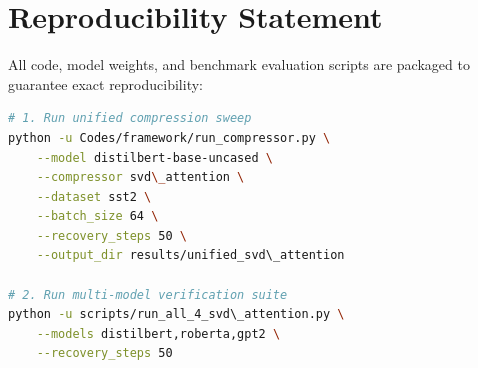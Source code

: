 \section{Reproducibility Statement}
All code, model weights, and benchmark evaluation scripts are packaged to guarantee exact reproducibility:
\begin{lstlisting}[language=bash]
# 1. Run unified compression sweep
python -u Codes/framework/run_compressor.py \
    --model distilbert-base-uncased \
    --compressor svd\_attention \
    --dataset sst2 \
    --batch_size 64 \
    --recovery_steps 50 \
    --output_dir results/unified_svd\_attention

# 2. Run multi-model verification suite
python -u scripts/run_all_4_svd\_attention.py \
    --models distilbert,roberta,gpt2 \
    --recovery_steps 50
\end{lstlisting}
